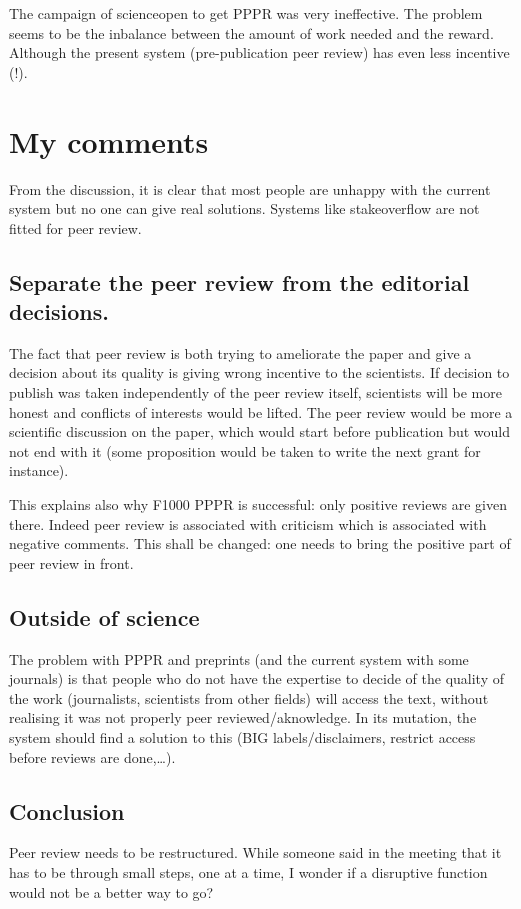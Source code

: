 \documentclass[]{article}
\begin{document}
The campaign of scienceopen to get PPPR was very ineffective. The
problem seems to be the inbalance between the amount of work needed and
the reward. Although the present system (pre-publication peer review)
has even less incentive (!).

\section{My comments}\label{my-comments}

From the discussion, it is clear that most people are unhappy with the
current system but no one can give real solutions. Systems like
stakeoverflow are not fitted for peer review.

\subsection{Separate the peer review from the editorial
decisions.}\label{separate-the-peer-review-from-the-editorial-decisions.}

The fact that peer review is both trying to ameliorate the paper and
give a decision about its quality is giving wrong incentive to the
scientists. If decision to publish was taken independently of the peer
review itself, scientists will be more honest and conflicts of interests
would be lifted. The peer review would be more a scientific discussion
on the paper, which would start before publication but would not end
with it (some proposition would be taken to write the next grant for
instance).

This explains also why F1000 PPPR is successful: only positive reviews
are given there. Indeed peer review is associated with criticism which
is associated with negative comments. This shall be changed: one needs
to bring the positive part of peer review in front.

\subsection{Outside of science}\label{outside-of-science}

The problem with PPPR and preprints (and the current system with some
journals) is that people who do not have the expertise to decide of the
quality of the work (journalists, scientists from other fields) will
access the text, without realising it was not properly peer
reviewed/aknowledge. In its mutation, the system should find a solution
to this (BIG labels/disclaimers, restrict access before reviews are
done,\ldots{}).

\subsection{Conclusion}\label{conclusion}

Peer review needs to be restructured. While someone said in the meeting
that it has to be through small steps, one at a time, I wonder if a
disruptive function would not be a better way to go?
\end{document}
